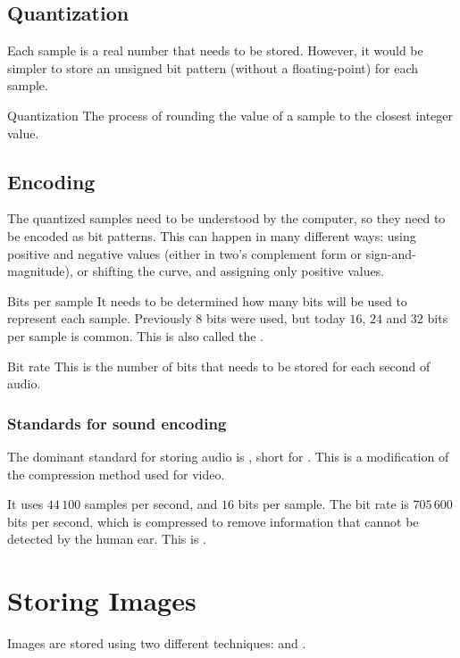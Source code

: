 \documentclass[\main/notes.tex]{subfiles}
\begin{document}
			\subsection{Quantization}
				Each sample is a real number that needs to be stored. However, it would be simpler to store an unsigned bit pattern (without a floating-point) for each sample.
				\begin{definition}{Quantization}
					The process of rounding the value of a sample to the closest integer value.
				\end{definition}
			\subsection{Encoding}
				The quantized samples need to be understood by the computer, so they need to be encoded as bit patterns. This can happen in many different ways: using positive and negative values (either in two's complement form or sign-and-magnitude), or shifting the curve, and assigning only positive values.
				\begin{definition}{Bits per sample}
					It needs to be determined how many bits will be used to represent each sample. Previously $8$ bits were used, but today $16$, $24$ and $32$ bits per sample is common. This is also called the .
				\end{definition}
				\begin{definition}{Bit rate}
					This is the number of bits that needs to be stored for each second of audio.
				\end{definition}
				\subsubsection{Standards for sound encoding}
					The dominant standard for storing audio is , short for . This is a modification of the  compression method used for video.
					\begin{indentparagraph}
						It uses $44 \, 100$ samples per second, and $16$ bits per sample. The bit rate is $705 \, 600$ bits per second, which is compressed to remove information that cannot be detected by the human ear. This is .
					\end{indentparagraph}
		\section{Storing Images}
			Images are stored using two different techniques:  and .
\end{document}
